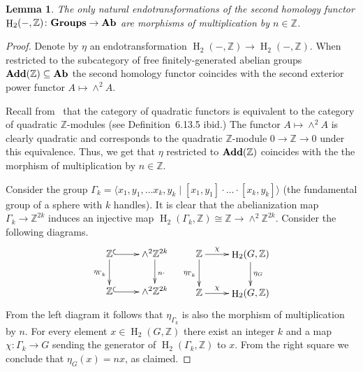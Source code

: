 \documentclass[oneside, 12pt]{amsart}
\theoremstyle{plain}
\numberwithin{equation}{section}
\newtheorem{lemma}{Lemma}
\numberwithin{lemma}{section}
\theoremstyle{remark}
\theoremstyle{definition}
\newcommand{\catname}[1]{{\normalfont\textbf{#1}}}
\DeclareMathOperator{\HH}{H}
\newcommand{\ZZ}{\mathbb{Z}}
\begin{document}
\begin{lemma} \label{lm:endotr} The only natural endotransformations of the second homology functor $\HH_2(-, \ZZ)\colon \catname{Groups}\to \catname{Ab}$ 
 are morphisms of multiplication by $n \in \ZZ$.
\end{lemma}
\begin{proof}
 Denote by $\eta$ an endotransformation $\HH_2(-, \ZZ) \to \HH_2(-, \ZZ)$.
 When restricted to the subcategory of free finitely-generated abelian groups $\catname{Add}(\ZZ) \subseteq \catname{Ab}$ the second homology functor
 coincides with the second exterior power functor $A \mapsto \wedge^2A$. 
 
 Recall from~\cite[Theorem~6.13.12]{Ba96} that the category of quadratic functors is equivalent to the category of quadratic $\ZZ$-modules (see Definition~6.13.5 ibid.)
 The functor $A \mapsto \wedge^2A$ is clearly quadratic and corresponds to the quadratic $\ZZ$-module $0 \to \ZZ \to 0$ under this equivalence.
 Thus, we get that $\eta$ restricted to $\catname{Add}(\ZZ)$ coincides with the the morphism of multiplication by $n\in \ZZ$.
 
 Consider the group $\Gamma_k = \langle x_1, y_1, \ldots x_k, y_k \mid [x_1, y_1]\cdot \ldots \cdot [x_k, y_k] \rangle$ (the fundamental group of a sphere with $k$ handles).
 It is clear that the abelianization map $\Gamma_k \to \ZZ^{2k}$ induces an injective map $\HH_2(\Gamma_k, \ZZ) \cong \ZZ \to \wedge^2\ZZ^{2k}$.  
 Consider the following diagrams.
  \[ \xymatrix{ \ZZ \ar@{^{(}->}[r] \ar[d]_{\eta_{\Gamma_k}} & \ar[d]^{n \cdot} \wedge^2\ZZ^{2k} \\
                \ZZ \ar@{^{(}->}[r]                          & \wedge^2\ZZ^{2k} } \ \ \ 
     \xymatrix{   \ZZ  \ar[r]^(.35){\chi} \ar[d]_{\eta_{\Gamma_k}} & \ar[d]^{\eta_G} \HH_2(G, \ZZ) \\
                  \ZZ  \ar[r]^(.35){\chi}                          & \HH_2(G, \ZZ)}  \]
 From the left diagram it follows that $\eta_{\Gamma_k}$ is also the morphism of multiplication by $n$.
 For every element $x\in \HH_2(G, \ZZ)$ there exist an integer $k$ and a map $\chi\colon \Gamma_k\to G$ sending the generator of $\HH_2(\Gamma_k, \ZZ)$ to $x$.
 From the right square we conclude that $\eta_G(x) = nx$, as claimed.

 
\end{proof}
\end{document}
